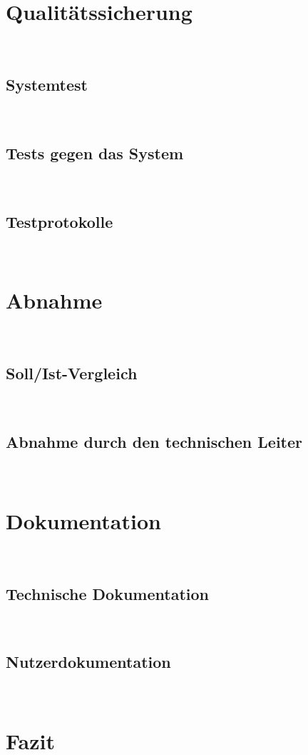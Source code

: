 \documentclass[11pt,toc=sectionentrywithoutdots, 
headheight=44pt, headings=optiontoheadandtoc, hyperfootnotes=false, hypertexnames=false]{scrartcl}
\begin{document}
\section{Qualitätssicherung}
\blindtext\

\subsection{Systemtest}
\blindtext\

\subsection{Tests gegen das System}
\blindtext\

\subsection{Testprotokolle}
\blindtext\

\section{Abnahme}
\blindtext\

\subsection{Soll/Ist-Vergleich}
\blindtext\

\subsection{Abnahme durch den technischen Leiter}
\blindtext\

\section{Dokumentation}
\blindtext\

\subsection{Technische Dokumentation}
\blindtext\

\subsection{Nutzerdokumentation}
\blindtext\

\section{Fazit}
\blindtext\
\end{document}
